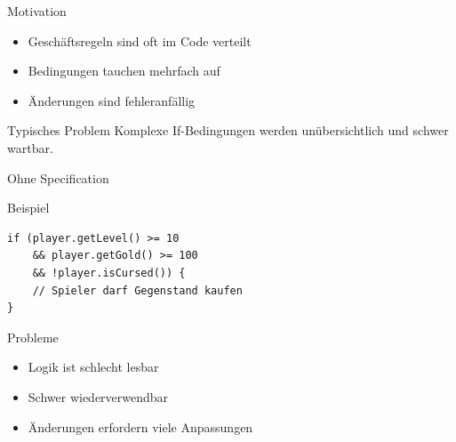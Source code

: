 \begin{frame}{Motivation}
	\begin{itemize}
	  \item Geschäftsregeln sind oft im Code verteilt
	  \item Bedingungen tauchen mehrfach auf
	  \item Änderungen sind fehleranfällig
	\end{itemize}
	\pause
	\begin{alertblock}{Typisches Problem}
		Komplexe If-Bedingungen werden unübersichtlich und schwer wartbar.
	\end{alertblock}
\end{frame}


\begin{frame}[fragile]{Ohne Specification}
	\begin{exampleblock}{Beispiel}
		\begin{lstlisting}
if (player.getLevel() >= 10
    && player.getGold() >= 100
    && !player.isCursed()) {
    // Spieler darf Gegenstand kaufen
}
		\end{lstlisting}
	\end{exampleblock}
\end{frame}

\begin{frame}{Probleme}
	\begin{itemize}
	  \item Logik ist schlecht lesbar
	  \item Schwer wiederverwendbar
	  \item Änderungen erfordern viele Anpassungen
	\end{itemize}
\end{frame}
